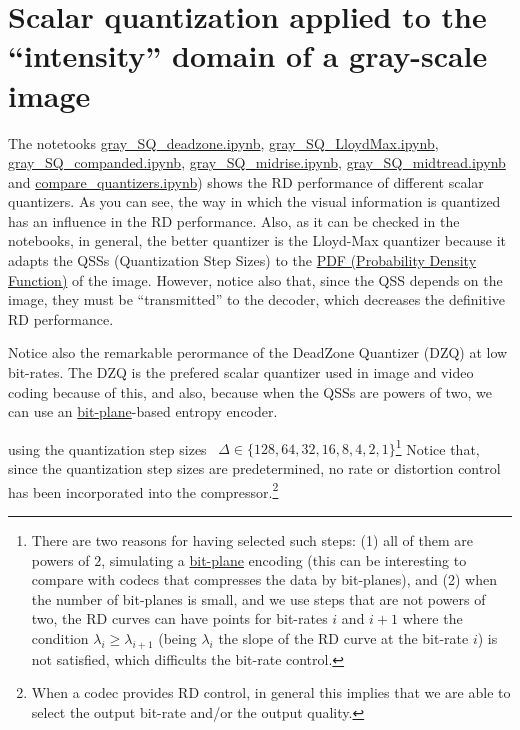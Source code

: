 \section{Scalar quantization applied to the ``intensity'' domain of a gray-scale image}
The notetooks
\href{https://github.com/Sistemas-Multimedia/Sistemas-Multimedia.github.io/blob/master/contents/gray_SQ/gray_SQ_deadzone.ipynb}{gray\_SQ\_deadzone.ipynb},
\href{https://github.com/Sistemas-Multimedia/Sistemas-Multimedia.github.io/blob/master/contents/gray_SQ/gray_SQ_LloydMax.ipynb}{gray\_SQ\_LloydMax.ipynb},
\href{https://github.com/Sistemas-Multimedia/Sistemas-Multimedia.github.io/blob/master/contents/gray_SQ/gray_SQ_companded.ipynb}{gray\_SQ\_companded.ipynb},
\href{https://github.com/Sistemas-Multimedia/Sistemas-Multimedia.github.io/blob/master/contents/gray_SQ/gray_SQ_midrise.ipynb}{gray\_SQ\_midrise.ipynb},
\href{https://github.com/Sistemas-Multimedia/Sistemas-Multimedia.github.io/blob/master/contents/gray_SQ/gray_SQ_midtread.ipynb}{gray\_SQ\_midtread.ipynb}
and
\href{https://github.com/Sistemas-Multimedia/Sistemas-Multimedia.github.io/blob/master/contents/gray_SQ/compare_quantizers.ipynb}{compare\_quantizers.ipynb})
shows the RD performance of different scalar quantizers. As you can
see, the way in which the visual information is quantized has an
influence in the RD performance. Also, as it can be checked in the
notebooks, in general, the better quantizer is the Lloyd-Max quantizer
because it adapts the QSSs (Quantization Step Sizes) to the
\href{https://en.wikipedia.org/wiki/Probability_density_function}{PDF
  (Probability Density Function)} of the image. However, notice also
that, since the QSS depends on the image, they must be ``transmitted''
to the decoder, which decreases the definitive RD performance.

Notice also the remarkable perormance of the DeadZone Quantizer (DZQ)
at low bit-rates. The DZQ is the prefered scalar quantizer used in
image and video coding because of this, and also, because when the
QSSs are powers of two, we can use an
\href{https://en.wikipedia.org/wiki/Bit_plane}{bit-plane}-based
entropy encoder.

using the
quantization step sizes~\cite{vruiz__scalar_quantization}
$\Delta\in\{128, 64, 32, 16, 8, 4, 2, 1\}$\footnote{There are two
reasons for having selected such steps: (1) all of them are powers of
$2$, simulating a
\href{https://en.wikipedia.org/wiki/Bit_plane}{bit-plane} encoding
(this can be interesting to compare with codecs that compresses the
data by bit-planes), and (2) when the number of bit-planes is small,
and we use steps that are not powers of two, the RD curves can have
points for bit-rates $i$ and $i+1$ where the condition
$\lambda_i\ge\lambda_{i+1}$ (being $\lambda_i$ the slope of the RD
curve at the bit-rate $i$) is not satisfied, which difficults the
bit-rate control.} Notice that, since the quantization step sizes are
predetermined, no rate or distortion
control~\cite{vruiz__information_theory} has been incorporated into
the compressor.\footnote{When a codec provides RD control, in general
this implies that we are able to select the output bit-rate and/or the
output quality.}

